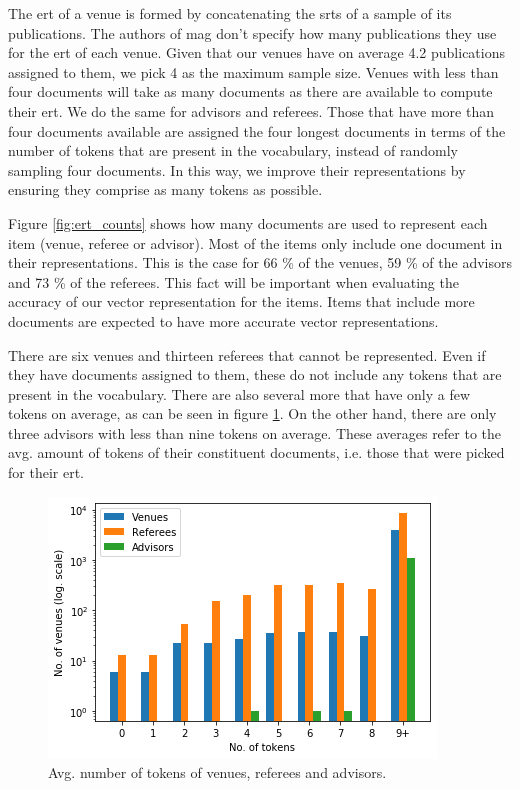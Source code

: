 The \acrshort{ert} of a venue is formed by concatenating the \acrshort{srt}s of a sample of its publications. The authors of \acrshort{mag} don't specify how many publications they use for the \acrshort{ert} of each venue. Given that our venues have on average 4.2 publications assigned to them, we pick 4 as the maximum sample size. Venues with less than four documents will take as many documents as there are available to compute their \acrshort{ert}. We do the same for advisors and referees. Those that have more than four documents available are assigned the four longest documents in terms of the number of tokens that are present in the vocabulary, instead of randomly sampling four documents. In this way, we improve their representations by ensuring they comprise as many tokens as possible.

Figure \ref{fig:ert_counts} shows how many documents are used to represent each item (venue, referee or advisor). Most of the items only include one document in their representations. This is the case for 66 \% of the venues, 59 \% of the advisors and 73 \% of the referees. This fact will be important when evaluating the accuracy of our vector representation for the items. Items that include more documents are expected to have more accurate vector representations.

There are six venues and thirteen referees that cannot be represented. Even if they have documents assigned to them, these do not include any tokens that are present in the vocabulary. There are also several more that have only a few tokens on average, as can be seen in figure \ref{fig:bow_venues}. On the other hand, there are only three advisors with less than nine tokens on average. These averages refer to the avg. amount of tokens of their constituent documents, i.e. those that were picked for their \acrshort{ert}.

\begin{figure}
    \centering
    \includegraphics[width=.7\textwidth]{figures/unsupervised_approach/bow_venues.png}
    \caption{Avg. number of tokens of venues, referees and advisors.}
    \label{fig:bow_venues}
\end{figure}

